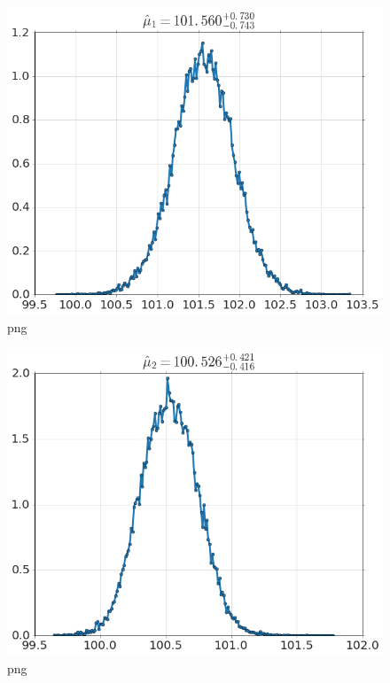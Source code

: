 \begin{figure}[htbp]
\centering
\includegraphics{output_5_0.png}
\caption{png}
\end{figure}

\begin{Shaded}
\begin{Highlighting}[]
\NormalTok{)}
\end{Highlighting}
\end{Shaded}

\begin{figure}[htbp]
\centering
\includegraphics{output_6_0.png}
\caption{png}
\end{figure}

